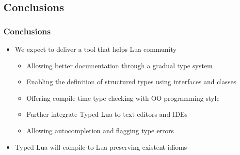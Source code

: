 \documentclass{beamer}
\begin{document}
\subsection{Conclusions}
\begin{frame}
\frametitle{Conclusions}
\begin{itemize}
\item We expect to deliver a tool that helps Lua community
\begin{itemize}
\item Allowing better documentation through a gradual type system
\item Enabling the definition of structured types using interfaces and classes
\item Offering compile-time type checking with OO programming style
\item Further integrate Typed Lua to text editors and IDEs
\item Allowing autocompletion and flagging type errors
\end{itemize}
\item Typed Lua will compile to Lua preserving existent idioms
\end{itemize}
\end{frame}
\end{document}
